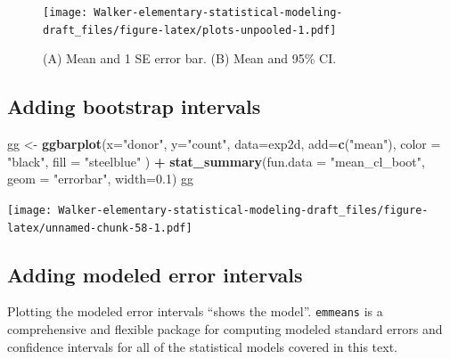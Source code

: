 \documentclass[]{book}
\newenvironment{Shaded}{\begin{snugshade}}{\end{snugshade}}
\newcommand{\KeywordTok}[1]{\textcolor[rgb]{0.13,0.29,0.53}{\textbf{#1}}}
\newcommand{\DataTypeTok}[1]{\textcolor[rgb]{0.13,0.29,0.53}{#1}}
\newcommand{\FloatTok}[1]{\textcolor[rgb]{0.00,0.00,0.81}{#1}}
\newcommand{\StringTok}[1]{\textcolor[rgb]{0.31,0.60,0.02}{#1}}
\newcommand{\OperatorTok}[1]{\textcolor[rgb]{0.81,0.36,0.00}{\textbf{#1}}}
\newcommand{\NormalTok}[1]{#1}
\begin{document}
\begin{figure}
\centering
\texttt{[image: Walker-elementary-statistical-modeling-draft\_files/figure-latex/plots-unpooled-1.pdf]}
\caption{\label{fig:plots-unpooled}(A) Mean and 1 SE error bar. (B) Mean and
95\% CI.}
\end{figure}

\subsection{Adding bootstrap
intervals}\label{adding-bootstrap-intervals}

\begin{Shaded}
\begin{Highlighting}[]
\NormalTok{gg <-}\StringTok{ }\KeywordTok{ggbarplot}\NormalTok{(}\DataTypeTok{x=}\StringTok{"donor"}\NormalTok{, }
                \DataTypeTok{y=}\StringTok{"count"}\NormalTok{, }
                \DataTypeTok{data=}\NormalTok{exp2d,}
                \DataTypeTok{add=}\KeywordTok{c}\NormalTok{(}\StringTok{"mean"}\NormalTok{),}
                \DataTypeTok{color =} \StringTok{"black"}\NormalTok{,}
                \DataTypeTok{fill =} \StringTok{"steelblue"}
\NormalTok{) }\OperatorTok{+}\StringTok{ }
\StringTok{  }\KeywordTok{stat_summary}\NormalTok{(}\DataTypeTok{fun.data =} \StringTok{"mean_cl_boot"}\NormalTok{, }\DataTypeTok{geom =} \StringTok{"errorbar"}\NormalTok{, }\DataTypeTok{width=}\FloatTok{0.1}\NormalTok{)}
\NormalTok{gg}
\end{Highlighting}
\end{Shaded}

\texttt{[image: Walker-elementary-statistical-modeling-draft\_files/figure-latex/unnamed-chunk-58-1.pdf]}

\subsection{Adding modeled error
intervals}\label{adding-modeled-error-intervals}

Plotting the modeled error intervals ``shows the model''.
\texttt{emmeans} is a comprehensive and flexible package for computing
modeled standard errors and confidence intervals for all of the
statistical models covered in this text.
\end{document}
